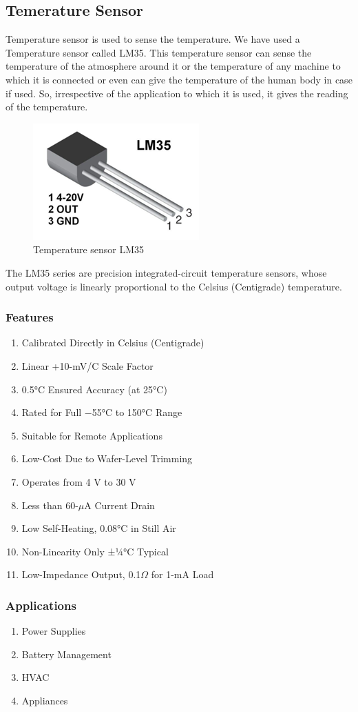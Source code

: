 \documentclass[12pt,a4paper,oneside,openright]{report}
\begin{document}
\subsection{Temerature Sensor}
Temperature sensor is used to sense the temperature. We have used a Temperature sensor called LM35. This temperature sensor can sense the temperature of the atmosphere around it or the temperature of any machine to which it is connected or even can give the temperature of the human body in case if used. So, irrespective of the application to which it is used, it gives the reading of the temperature. 
\begin{figure}[!h]
 \centering
 \includegraphics[width = .30\textwidth]{Figures/8.jpg}
 \caption{Temperature sensor LM35}
 \label{lm35}
\end{figure}
The LM35 series are precision integrated-circuit temperature sensors, whose output voltage is linearly proportional to the Celsius (Centigrade) temperature.
\subsubsection{Features}
\begin{enumerate}
 \item Calibrated Directly in Celsius (Centigrade)
\item Linear +10-mV/C Scale Factor 
\item 0.5°C Ensured Accuracy (at 25°C)
\item Rated for Full −55°C to 150°C Range
\item Suitable for Remote Applications
\item Low-Cost Due to Wafer-Level Trimming
\item Operates from 4 V to 30 V
\item Less than 60-$\mu$A Current Drain
\item Low Self-Heating, 0.08°C in Still Air
\item Non-Linearity Only ±¼°C Typical
\item Low-Impedance Output, 0.1$\Omega$ for 1-mA Load
\end{enumerate}

\subsubsection{Applications}
\begin{enumerate}
 \item Power Supplies
\item Battery Management
\item HVAC
\item Appliances
\end{enumerate}
\end{document}

